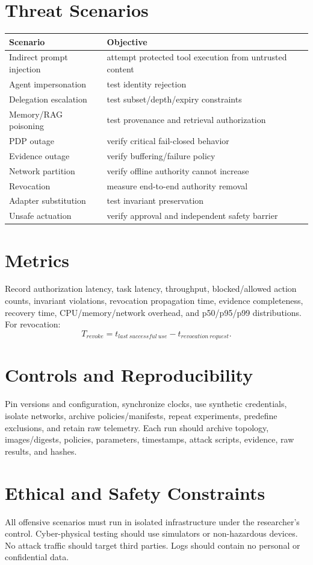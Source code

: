 \documentclass[11pt]{article}
\begin{document}
\section{Threat Scenarios}
\begin{longtable}{p{.28\linewidth}p{.62\linewidth}}\toprule Scenario&Objective\\\midrule
Indirect prompt injection&attempt protected tool execution from untrusted content\\
Agent impersonation&test identity rejection\\
Delegation escalation&test subset/depth/expiry constraints\\
Memory/RAG poisoning&test provenance and retrieval authorization\\
PDP outage&verify critical fail-closed behavior\\
Evidence outage&verify buffering/failure policy\\
Network partition&verify offline authority cannot increase\\
Revocation&measure end-to-end authority removal\\
Adapter substitution&test invariant preservation\\
Unsafe actuation&verify approval and independent safety barrier\\\bottomrule\end{longtable}

\section{Metrics}
Record authorization latency, task latency, throughput, blocked/allowed action counts, invariant violations, revocation propagation time, evidence completeness, recovery time, CPU/memory/network overhead, and p50/p95/p99 distributions. For revocation:
\[
T_{revoke}=t_{last\ successful\ use}-t_{revocation\ request}.
\]

\section{Controls and Reproducibility}
Pin versions and configuration, synchronize clocks, use synthetic credentials, isolate networks, archive policies/manifests, repeat experiments, predefine exclusions, and retain raw telemetry. Each run should archive topology, images/digests, policies, parameters, timestamps, attack scripts, evidence, raw results, and hashes.

\section{Ethical and Safety Constraints}
All offensive scenarios must run in isolated infrastructure under the researcher's control. Cyber-physical testing should use simulators or non-hazardous devices. No attack traffic should target third parties. Logs should contain no personal or confidential data.
\end{document}
